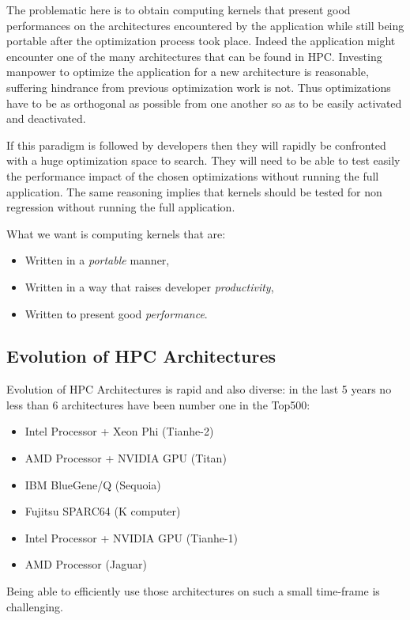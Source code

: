 \documentclass[11pt, a4paper, twoside]{montblanc}
\begin{document}
The problematic here is to obtain computing kernels that present good
performances on the architectures encountered by the application while still
being portable after the optimization process took place. Indeed the
application might encounter one of the many architectures that can be found in
HPC. Investing manpower to optimize the application for a new architecture is
reasonable, suffering hindrance from previous optimization work is not. Thus
optimizations have to be as orthogonal as possible from one another so as to be
easily activated and deactivated.

If this paradigm is followed by developers then they will rapidly be confronted
with a huge optimization space to search. They will need to be able to test
easily the performance impact of the chosen optimizations without running the
full application. The same reasoning implies that kernels should be tested for
non regression without running the full application.

What we want is computing kernels that are:
\begin{itemize}
\item Written in a \emph{portable} manner,
\item Written in a way that raises developer \emph{productivity},
\item Written to present good \emph{performance}.
\end{itemize}



  \subsection{Evolution of HPC Architectures}

Evolution of HPC Architectures is rapid and also diverse: in the last 5
years no less than 6 architectures have been number one in the Top500:
\begin{itemize}
\item Intel Processor + Xeon Phi (Tianhe-2)
\item AMD Processor + NVIDIA GPU (Titan)
\item IBM BlueGene/Q (Sequoia)
\item Fujitsu SPARC64 (K computer)
\item Intel Processor + NVIDIA GPU (Tianhe-1)
\item AMD Processor (Jaguar)
\end{itemize}
Being able to efficiently use those architectures on such a small
time-frame is challenging.
\end{document}
